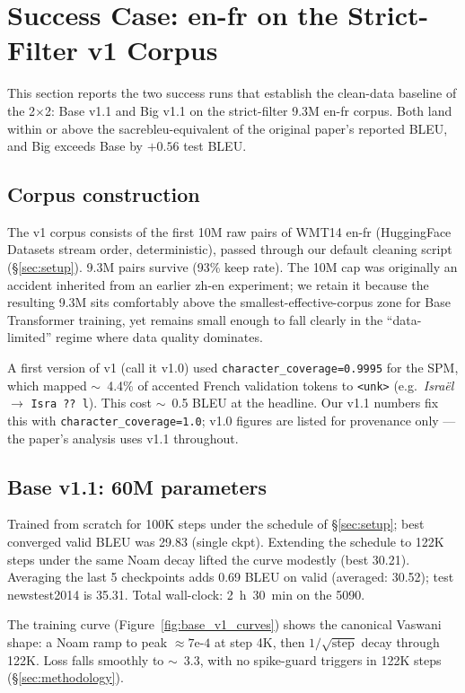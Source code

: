 \section{Success Case: en-fr on the Strict-Filter v1 Corpus}
\label{sec:enfr_v1}

This section reports the two success runs that establish the clean-data baseline of the 2$\times$2: Base v1.1 and Big v1.1 on the strict-filter 9.3M en-fr corpus. Both land within or above the sacrebleu-equivalent of the original paper's reported BLEU, and Big exceeds Base by $+0.56$ test BLEU.

\subsection{Corpus construction}
\label{sec:v1_corpus}
The v1 corpus consists of the first 10M raw pairs of WMT14 en-fr (HuggingFace Datasets stream order, deterministic), passed through our default cleaning script (\S\ref{sec:setup}). 9.3M pairs survive (93\% keep rate). The 10M cap was originally an accident inherited from an earlier zh-en experiment; we retain it because the resulting 9.3M sits comfortably above the smallest-effective-corpus zone for Base Transformer training, yet remains small enough to fall clearly in the ``data-limited'' regime where data quality dominates.

A first version of v1 (call it v1.0) used \texttt{character\_coverage=0.9995} for the SPM, which mapped $\sim$~4.4\% of accented French validation tokens to \texttt{<unk>} (e.g.\ \textit{Israël} $\rightarrow$ \texttt{Isra ?? l}). This cost $\sim$~0.5 BLEU at the headline. Our v1.1 numbers fix this with \texttt{character\_coverage=1.0}; v1.0 figures are listed for provenance only --- the paper's analysis uses v1.1 throughout.

\subsection{Base v1.1: 60M parameters}
\label{sec:base_v1}
Trained from scratch for 100K steps under the schedule of \S\ref{sec:setup}; best converged valid BLEU was 29.83 (single ckpt). Extending the schedule to 122K steps under the same Noam decay lifted the curve modestly (best 30.21). Averaging the last 5 checkpoints adds 0.69 BLEU on valid (averaged: 30.52); test newstest2014 is 35.31. Total wall-clock: 2~h~30~min on the 5090.

The training curve (Figure~\ref{fig:base_v1_curves}) shows the canonical Vaswani shape: a Noam ramp to peak $\approx 7\text{e-}4$ at step 4K, then $1/\sqrt{\text{step}}$ decay through 122K. Loss falls smoothly to $\sim$~3.3, with no spike-guard triggers in 122K steps (\S\ref{sec:methodology}).

